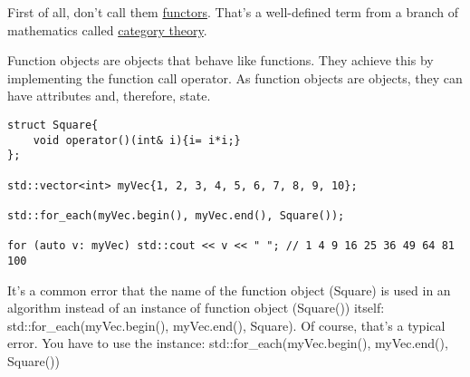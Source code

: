 First of all, don’t call them \href{https://en.wikipedia.org/wiki/Functor}{functors}. That’s a well-defined term from a branch of mathematics called \href{https://en.wikipedia.org/wiki/Category_theory}{category theory}.

Function objects are objects that behave like functions. They achieve this by implementing the function call operator. As function objects are objects, they can have attributes and, therefore, state.

\begin{lstlisting}[style=styleCXX]
struct Square{
	void operator()(int& i){i= i*i;}
};

std::vector<int> myVec{1, 2, 3, 4, 5, 6, 7, 8, 9, 10};

std::for_each(myVec.begin(), myVec.end(), Square());

for (auto v: myVec) std::cout << v << " "; // 1 4 9 16 25 36 49 64 81 100
\end{lstlisting}

\begin{tcolorbox}[colback=blue!5!white,colframe=blue!75!black,title={Instantiate function objects to use them}]
It’s a common error that the name of the function object (Square) is used in an algorithm instead of an instance of function object (Square()) itself: std::for\_each(myVec.begin(), myVec.end(), Square). Of course, that’s a typical error. You have to use the instance: std::for\_each(myVec.begin(), myVec.end(), Square())
\end{tcolorbox}